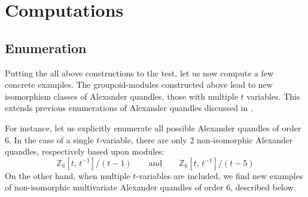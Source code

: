 \documentclass[a4paper,12pt]{article}
\begin{document}
\section{Computations }  

\subsection{Enumeration }

Putting the all above constructions to the test, let us now compute a few concrete examples. The groupoid-modules constructed above lead to new isomorphism classes of Alexander quandles, those with multiple $t$ variables. This extends previous enumerations of Alexander quandles discussed in    \cite{nelson1, nelson2, lopes2006finite,  vendramin2012, clark2014quandle, higashitani2024classification}.  

For instance, let us explicitly enumerate all possible Alexander quandles of order 6. In the case of a single $t$-variable, there are only 2 non-isomorphic Alexander quandles, respectively based upon modules:  
\[  \mathbb{Z}_6 [t, \, t^{-1}] / (t-1)  \qquad  \mbox{and}  \qquad   \mathbb{Z}_6 [t, \, t^{-1}] / (t-5)  \]
On the other hand, when multiple $t$-variables are included, we find new examples of non-isomorphic multivariate Alexander quandles of order 6, described below.
\end{document}
